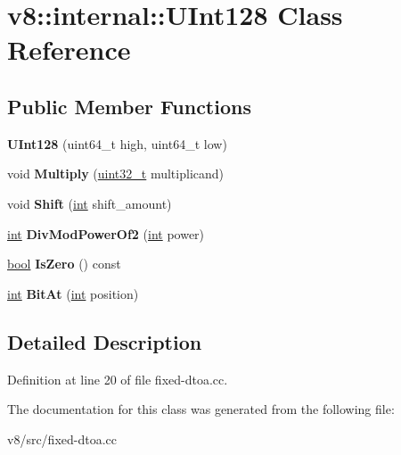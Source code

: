 \hypertarget{classv8_1_1internal_1_1UInt128}{}\section{v8\+:\+:internal\+:\+:U\+Int128 Class Reference}
\label{classv8_1_1internal_1_1UInt128}
\subsection*{Public Member Functions}
\begin{DoxyCompactItemize}
\item 
\mbox{\label{classv8_1_1internal_1_1UInt128_afe2e8e25543ca2fa36bf4bfbb70036f9}} 
{\bfseries U\+Int128} (uint64\+\_\+t high, uint64\+\_\+t low)
\item 
\mbox{\label{classv8_1_1internal_1_1UInt128_aac3862710a8cd4c8b806ae8f6e2d0e2b}} 
void {\bfseries Multiply} (\mbox{\hyperlink{classuint32__t}{uint32\+\_\+t}} multiplicand)
\item 
\mbox{\label{classv8_1_1internal_1_1UInt128_ab99d0359de762cf7742b74c91b30f54f}} 
void {\bfseries Shift} (\mbox{\hyperlink{classint}{int}} shift\+\_\+amount)
\item 
\mbox{\label{classv8_1_1internal_1_1UInt128_abd135199bd3e858d47182f6187a38723}} 
\mbox{\hyperlink{classint}{int}} {\bfseries Div\+Mod\+Power\+Of2} (\mbox{\hyperlink{classint}{int}} power)
\item 
\mbox{\label{classv8_1_1internal_1_1UInt128_a6a50d0e12c4e568d3a43edefe1108441}} 
\mbox{\hyperlink{classbool}{bool}} {\bfseries Is\+Zero} () const
\item 
\mbox{\label{classv8_1_1internal_1_1UInt128_a648274c78f41bb8e940d5fc0fd54be25}} 
\mbox{\hyperlink{classint}{int}} {\bfseries Bit\+At} (\mbox{\hyperlink{classint}{int}} position)
\end{DoxyCompactItemize}


\subsection{Detailed Description}


Definition at line 20 of file fixed-\/dtoa.\+cc.



The documentation for this class was generated from the following file\+:\begin{DoxyCompactItemize}
\item 
v8/src/fixed-\/dtoa.\+cc\end{DoxyCompactItemize}
